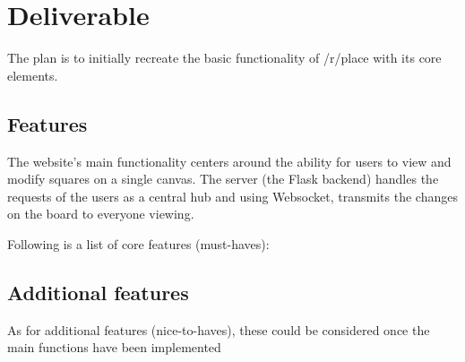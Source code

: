 \clearpage


\section{Deliverable}\label{sec:deliverable}

The plan is to initially recreate the basic functionality of /r/place with its core elements.

\subsection{Features}\label{subsec:features}

The website's main functionality centers around the ability for users to view and modify squares on a single canvas.
The server (the Flask backend) handles the requests of the users as a central hub and using Websocket, transmits the changes on the board to everyone viewing.

Following is a list of core features (must-haves):

\begin{table}[!h]
    \caption{Main features}
    \label{tab:mainFeatures}
\end{table}

\subsection{Additional features}\label{subsec:additional-features}

As for additional features (nice-to-haves), these could be considered once the main functions have been implemented

\begin{table}[!h]
    \caption{Additional features}
    \label{tab:additionalFeatures}
\end{table}
